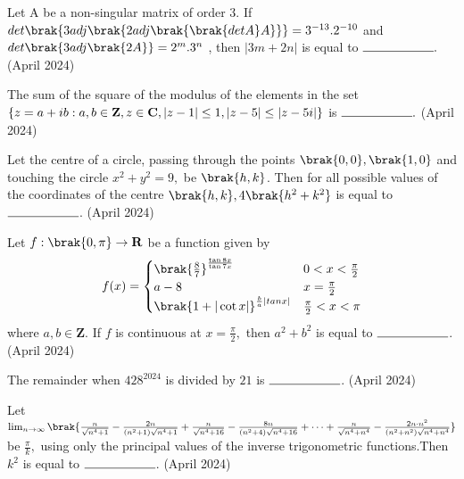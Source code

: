 \iffalse
\title{April 2024}
\author{EE24BTECH11058}
\section{integer}
\fi

   \item Let A be a non-singular matrix of order $3$. If $det\brak{3adj\brak{2adj\brak{\brak{det A}A}}} = 3^{-13} . 2^{-10}$ and $det\brak{3adj\brak{2A}}= 2^m.3^n$ , then $|3m + 2n|$ is equal to $ \rule{2cm}{0.15mm}.$ 
   \hfill(April 2024) \\

   \item  The sum of the square of the modulus of the elements in the set $ \{ z=a+ib : a,b \in \textbf{Z},z \in \textbf{C},|z-1| \le 1,\\ |z-5| \le |z-5i| \}$  is $ \rule{2cm}{0.15mm}.$ 
   \hfill(April 2024) \\

   \item Let the centre of a circle, passing through the points $\brak{0,0}, \brak{1,0}$ and touching the circle $x^{2} + y^{2} = 9,$ be $\brak{h,k}$. Then for all possible values of the coordinates of the centre $\brak{h,k} , 4\brak{h^{2} + k^{2}} $ is equal to $\rule{2cm}{0.15mm}$.
   \hfill(April 2024) \\

   \item Let $f:\brak{0,\pi} \rightarrow\textbf{R}$ be a function given by 
   \begin{align*}
   f(x) =
    \begin{cases} 
     \brak{\frac{8}{7}} ^ \frac{\tan 8x}{\tan 7x} & 0 <x<\frac{\pi}{2} \\
      a-8 & x = \frac{\pi}{2}\\
      \brak{1+|\cot x|} ^ {\frac{b}{a} |tanx|} & \frac{\pi}{2} < x <\pi
        \end{cases}
  \end{align*}
  where $a,b \in \textbf{Z}.$ If $f$ is continuous at $x = \frac{\pi}{2},$ then $a^2 + b^2$ is equal to $\rule{2cm}{0.15mm}$.\hfill(April 2024) \\

  \item The remainder when $428 ^{2024}$ is divided by $21$ is $\rule{2cm}{0.15mm}$. 
  \hfill(April 2024) \\

  \item Let $\lim_{n\rightarrow\infty}\brak{\frac{n}{\sqrt{n^{4}+1}}-\frac{2n}{(n^{2}+1)\sqrt{n^{4}+1}}+\frac{n}{\sqrt{n^{4}+16}}-\frac{8n}{(n^{2}+4)\sqrt{n^{4}+16}} +\cdots+\frac{n}{\sqrt{n^{4}+n^{4}}}-\frac{2n\cdot n^{2}}{(n^{2}+n^{2})\sqrt{n^{4}+n^{4}}}}$ be $\frac{\pi}{k},$ using only the principal values of the inverse trigonometric functions.Then $k^2$ is equal to $\rule{2cm}{0.15mm}$.
  \hfill(April 2024)\\
 
